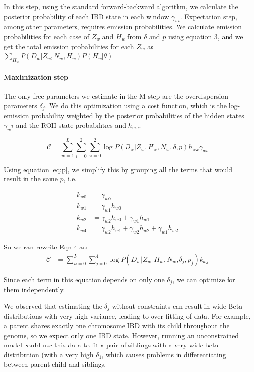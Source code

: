 \documentclass[12pt, letterpaper]{article}
\begin{document}
In this step, using the standard forward-backward algorithm, we calculate the posterior probability of each IBD state in each window $\gamma_{wi}$. Expectation step, among other parameters, requires emission probabilities. We calculate emission probabilities for each case of $Z_w$ and $H_w$ from $\delta$ and $p$ using equation 3, and we get the total emission probabilities for each $Z_w$ as $\sum_{H_w} P(D_w|Z_w,N_w,H_w) P(H_w|\theta)$

\paragraph{Maximization step}

The only free parameters we estimate in the M-step are the overdispersion parameters $\delta_j$. We do this optimization using a cost function, which is the log-emission probability weighted by the posterior probabilities of the hidden states $\gamma_wi$ and the ROH state-probabilities and $h_{w\omega}$.


\begin{equation}
\mathcal{C} = \sum_{w=1}^L \sum_{i=0}^2\sum^2_{\omega=0} \log P(D_{w}|Z_w, H_w, N_w, \delta, p)h_{w\omega}\gamma_{wi}
\end{equation}


Using equation \ref{eq:p}, we simplify this by grouping all the terms that would result in the same $p$, i.e.

\begin{align*}
k_{w0} &= \gamma_{w0}\\
k_{w1} &= \gamma_{w1} h_{w0}\\
k_{w2} &= \gamma_{w2} h_{w0} + \gamma_{w1} h_{w1}\\
k_{w4} &= \gamma_{w2} h_{w1} + \gamma_{w2} h_{w2} + \gamma_{w1} h_{w2}
\end{align*}

So we can rewrite Eqn 4 as:
\begin{align}
\mathcal{C} &= \sum_{w=0}^L\sum_{j=0}^4  \log P(D_{w}|Z_w, H_w, N_w, \delta_j, p_j)k_{wj}
\end{align}

Since each term in this equation depends on only one $\delta_j$, we can optimize for them independently.


We observed that estimating the $\delta_j$ without constraints can result in wide Beta distributions with very high variance, leading to over fitting of data. For example, a parent  shares exactly one chromosome IBD with its child throughout the genome, so we expect only one IBD state. However,  running an unconstrained model could use this data to fit a pair of siblings with a very wide beta-distribution (with a very high $\delta_1$, which causes problems in differentiating between parent-child and siblings.
\end{document}
